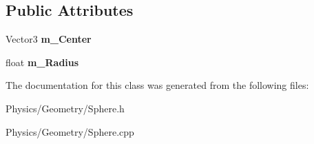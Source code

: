 \subsection*{Public Attributes}
\begin{DoxyCompactItemize}
\item 
\mbox{\label{classSphere_a246d1e074e26dab165c5e7847618649c}} 
Vector3 {\bfseries m\+\_\+\+Center}
\item 
\mbox{\label{classSphere_a013e6356f37b24bddda33ff36bfdcd76}} 
float {\bfseries m\+\_\+\+Radius}
\end{DoxyCompactItemize}


The documentation for this class was generated from the following files\+:\begin{DoxyCompactItemize}
\item 
Physics/\+Geometry/Sphere.\+h\item 
Physics/\+Geometry/Sphere.\+cpp\end{DoxyCompactItemize}
